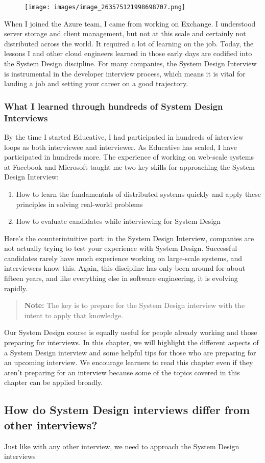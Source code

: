 \begin{figure}[htbp]
    \centering
    \texttt{[image: images/image\_263575121998698707.png]}
    
\end{figure}

When I joined the Azure team, I came from working on Exchange. I understood server storage and client management, but not at this scale and certainly not distributed across the world. It required a lot of learning on the job. Today, the lessons I and other cloud engineers learned in those early days are codified into the System Design discipline. For many companies, the System Design Interview is instrumental in the developer interview process, which means it is vital for landing a job and setting your career on a good trajectory. \subsubsection{What I learned through hundreds of System Design Interviews}\label{5Ai-AQby7BVCxBidhX3m3} By the time I started Educative, I had participated in hundreds of interview loops as both interviewee and interviewer. As Educative has scaled, I have participated in hundreds more. The experience of working on web-scale systems at Facebook and Microsoft taught me two key skills for approaching the System Design Interview: \begin{enumerate} \item {}\label{Ggzh5pTw39SD5OD34_J0H} How to learn the fundamentals of distributed systems quickly and apply these principles in solving real-world problems \item {}\label{uaDMkBB3F04VJuTLg7hyL} How to evaluate candidates while interviewing for System Design \end{enumerate} Here's the counterintuitive part: in the System Design Interview, companies are not actually trying to test your experience with System Design. Successful candidates rarely have much experience working on large-scale systems, and interviewers know this. Again, this discipline has only been around for about fifteen years, and like everything else in software engineering, it is evolving rapidly. \begin{quote} \textbf{Note:} The key is to prepare for the System Design interview with the intent to apply that knowledge. \end{quote} Our System Design course is equally useful for people already working and those preparing for interviews. In this chapter, we will highlight the different aspects of a System Design interview and some helpful tips for those who are preparing for an upcoming interview. We encourage learners to read this chapter even if they aren't preparing for an interview because some of the topics covered in this chapter can be applied broadly. \subsection{How do System Design interviews differ from other interviews?}\label{NQeNxrqfHqs-dvlwL9oyU} Just like with any other interview, we need to approach the System Design interviews 